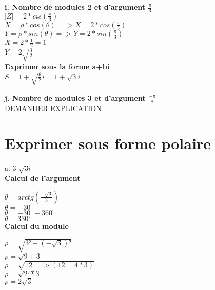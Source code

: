 \textbf{i. Nombre de modules 2 et d'argument $\frac{\pi}{3}$} \\

$|Z| = 2*cis(\frac{\pi}{3})$ \\

$X= \rho * cos(\theta) => X = 2*cos(\frac{\pi}{3})$  \\
$Y = \rho * sin(\theta) => Y = 2*sin(\frac{\pi}{3})$ \\

$X = 2*\frac{1}{2} = 1$ \\
$Y = 2\sqrt{\frac{3}{2}}$ \\

\textbf{Exprimer sous la forme a+bi} \\

$S = 1 + \sqrt{\frac{6}{2}} i = 1 + \sqrt{3} i$ \\

\newpage

\textbf{j. Nombre de modules 3 et d'argument $\frac{-\pi}{8}$} \\

DEMANDER EXPLICATION


\newpage
\vspace{3mm} %
\section{Exprimer sous forme polaire}
\vspace{3mm} %

a. 3-$\sqrt{3i}$ \\

\textbf{Calcul de l'argument} \\
\vspace{3mm} %

$\theta = arctg(\frac{-\sqrt{3}} {3})$ \\
$\theta = -30^{\circ}$ \\
$\theta = -30^{\circ} + 360^{\circ}$ \\
$\theta = 330^{\circ}$ \\

\textbf{Calcul du module} \\
\vspace{3mm} %

$\rho = \sqrt{3²+(-\sqrt{3})²}$ \\
$\rho = \sqrt{9+3}$ \\
$\rho = \sqrt{12 => (12=4*3)}$ \\
$\rho = \sqrt{2²*3}$ \\
$\rho = 2\sqrt{3}$ \\


